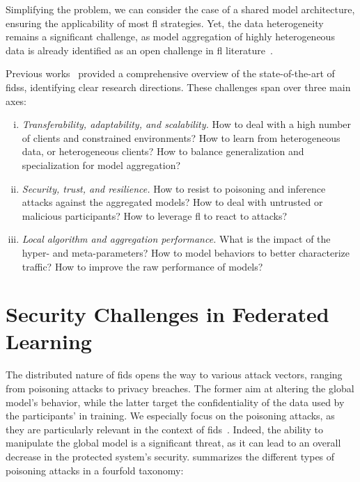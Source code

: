 \documentclass[conference]{IEEEtran}
\begin{document}
Simplifying the problem, we can consider the case of a shared model architecture, ensuring the applicability of most \gls{fl} strategies.
Yet, the data heterogeneity remains a significant challenge, as model aggregation of highly heterogeneous data is already identified as an open challenge in \gls{fl} literature~\cite{zhu_federated_2021}.

Previous works~\cite{lavaur_evolution_2022} provided a comprehensive overview of the state-of-the-art of \glspl{fids}, identifying clear research directions.
These challenges span over three main axes:

\begin{enumerate}[(i)]
    \item \emph{Transferability, adaptability, and scalability.}
    How to deal with a high number of clients and constrained environments?
    How to learn from heterogeneous data, or heterogeneous clients?
    How to balance generalization and specialization for model aggregation?

    \item \emph{Security, trust, and resilience.}
    How to resist to poisoning and inference attacks against the aggregated models?
    How to deal with untrusted or malicious participants?
    How to leverage \gls{fl} to react to attacks?

    \item \emph{Local algorithm and aggregation performance.}
    What is the impact of the hyper- and meta-parameters?
    How to model behaviors to better characterize traffic?
    How to improve the raw performance of models?
\end{enumerate}


\section{Security Challenges in Federated Learning} %
\label{sec:threats}

The distributed nature of \gls{fids} opens the way to various attack vectors, ranging from poisoning attacks to privacy breaches.
The former aim at altering the global model's behavior, while the latter target the confidentiality of the data used by the participants' in training.
We especially focus on the poisoning attacks, as they are particularly relevant in the context of \gls{fids}~\cite{lavaur_icdcs_demo}.
Indeed, the ability to manipulate the global model is a significant threat, as it can lead to an overall decrease in the protected system's security.
\citet{rodriguez-barroso_survey_2023} summarizes the different types of poisoning attacks in a fourfold taxonomy:
\end{document}
